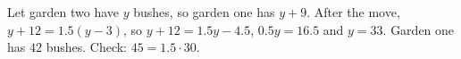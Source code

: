 Let garden two have $y$ bushes, so garden one has $y+9$. After the move, $y+12=1.5(y-3)$, so $y+12=1.5y-4.5$, $0.5y=16.5$ and $y=33$. Garden one has $\boxed{42}$ bushes. Check: $45=1.5\cdot30$.
